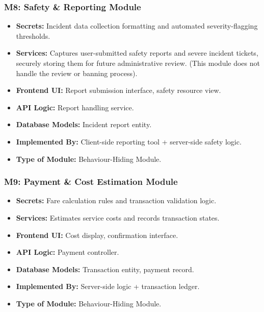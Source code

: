 \subsubsection*{M8: Safety \& Reporting Module}
\begin{itemize}
  \item \textbf{Secrets:} Incident data collection formatting and automated severity-flagging thresholds.
  \item \textbf{Services:} Captures user-submitted safety reports and severe incident tickets, securely storing them for future administrative review. (This module does not handle the review or banning process).
  \item \textbf{Frontend UI:} Report submission interface, safety resource view.
  \item \textbf{API Logic:} Report handling service.
  \item \textbf{Database Models:} Incident report entity.
  \item \textbf{Implemented By:} Client-side reporting tool + server-side safety logic.
  \item \textbf{Type of Module:} Behaviour-Hiding Module.
\end{itemize}

\subsubsection*{M9: Payment \& Cost Estimation Module}
\begin{itemize}
  \item \textbf{Secrets:} Fare calculation rules and transaction validation logic.
  \item \textbf{Services:} Estimates service costs and records transaction states.
  \item \textbf{Frontend UI:} Cost display, confirmation interface.
  \item \textbf{API Logic:} Payment controller.
  \item \textbf{Database Models:} Transaction entity, payment record.
  \item \textbf{Implemented By:} Server-side logic + transaction ledger.
  \item \textbf{Type of Module:} Behaviour-Hiding Module.
\end{itemize}

